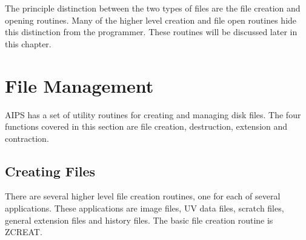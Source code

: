 The principle distinction between the two types of files are the file
creation and opening routines.  Many of the higher level creation and
file open routines hide this distinction from the programmer. These
routines will be discussed later in this chapter.


\section{File Management}
AIPS has a set of utility routines for creating and managing disk
files. The four functions covered in this section are file creation,
destruction, extension and contraction.


\subsection{Creating Files}
There are several higher level file creation routines, one for each of
several applications.  These applications are image files, UV data
files, scratch files, general extension files and history files.  The
basic file creation routine is ZCREAT.

